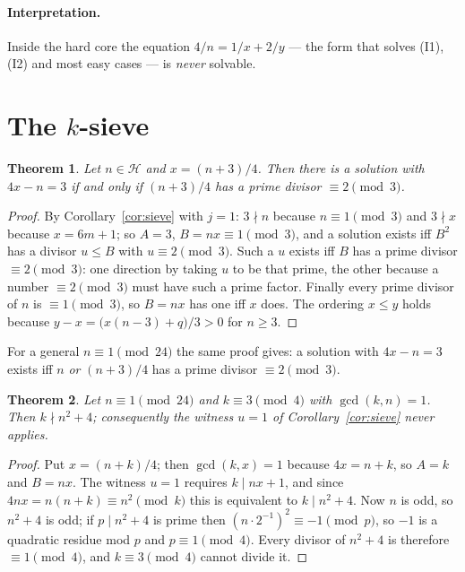 \documentclass[11pt,a4paper]{article}
\newtheorem{theorem}{Theorem}
\theoremstyle{definition}
\begin{document}
\paragraph{Interpretation.}
Inside the hard core the equation $4/n=1/x+2/y$ --- the form that solves (I1),
(I2) and most easy cases --- is \emph{never} solvable.

\section{The $k$-sieve}\label{sec:sieve}

\begin{theorem}\label{thm:k3}
Let $n\in\mathcal H$ and $x=(n+3)/4$. Then there is a solution with
$4x-n=3$ if and only if $(n+3)/4$ has a prime divisor $\equiv 2\pmod 3$.
\end{theorem}
\begin{proof}
By Corollary~\ref{cor:sieve} with $j=1$: $3\nmid n$ because $n\equiv 1\pmod 3$
and $3\nmid x$ because $x=6m+1$; so $A=3$, $B=nx\equiv 1\pmod 3$, and a
solution exists iff $B^{2}$ has a divisor $u\le B$ with $u\equiv 2\pmod 3$.
Such a $u$ exists iff $B$ has a prime divisor $\equiv 2\pmod 3$: one direction
by taking $u$ to be that prime, the other because a number $\equiv 2\pmod 3$
must have such a prime factor. Finally every prime divisor of $n$ is
$\equiv 1\pmod 3$, so $B=nx$ has one iff $x$ does. The ordering $x\le y$ holds
because $y-x=\bigl(x(n-3)+q\bigr)/3>0$ for $n\ge 3$.
\end{proof}

For a general $n\equiv 1\pmod{24}$ the same proof gives: a solution with
$4x-n=3$ exists iff $n$ \emph{or} $(n+3)/4$ has a prime divisor
$\equiv 2\pmod 3$.

\begin{theorem}\label{thm:noone}
Let $n\equiv 1\pmod{24}$ and $k\equiv 3\pmod 4$ with $\gcd(k,n)=1$. Then
$k\nmid n^{2}+4$; consequently the witness $u=1$ of
Corollary~\ref{cor:sieve} never applies.
\end{theorem}
\begin{proof}
Put $x=(n+k)/4$; then $\gcd(k,x)=1$ because $4x=n+k$, so $A=k$ and $B=nx$. The
witness $u=1$ requires $k\mid nx+1$, and since $4nx=n(n+k)\equiv n^{2}\pmod k$
this is equivalent to $k\mid n^{2}+4$. Now $n$ is odd, so $n^{2}+4$ is odd; if
$p\mid n^{2}+4$ is prime then $(n\cdot 2^{-1})^{2}\equiv -1\pmod p$, so $-1$
is a quadratic residue mod $p$ and $p\equiv 1\pmod 4$. Every divisor of
$n^{2}+4$ is therefore $\equiv 1\pmod 4$, and $k\equiv 3\pmod 4$ cannot divide
it.
\end{proof}
\end{document}
